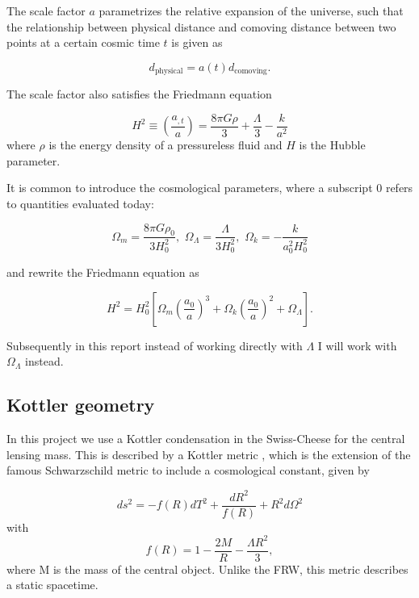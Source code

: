 The scale factor $a$ parametrizes the relative expansion of the universe, such that the relationship between physical distance and comoving distance between two points at a certain cosmic time $t$ is given as

\begin{equation}
  d_{\text{physical}} = a(t) d_{\text{comoving}}.
  \label{eq:comoving-physical-distance}
\end{equation}

The scale factor also satisfies the Friedmann equation

\begin{equation}
  H^2 \equiv \left ( \frac{a_{,t}}{a} \right ) = \frac{8\pi G \rho}{3} + \frac{\Lambda}{3} - \frac{k}{a^2}
  \label{eq:friedmann-equation}
\end{equation}
where $\rho$ is the energy density of a pressureless fluid and $H$ is the Hubble parameter. 

It is common to introduce the cosmological parameters, where a subscript 0 refers to quantities evaluated today: 

\begin{equation}
  \Omega_m = \frac{8\pi G \rho_0}{3H_0^2}, \,\, \Omega_{\Lambda} = \frac{\Lambda}{3H_0^2}, \,\, \Omega_k = - \frac{k}{a_0^2 H_0^2}
  \label{eq:cosmo-params}
\end{equation}

and rewrite the Friedmann equation as

\begin{equation}
  H^2 = H_0^2 \left [ \Omega_m \left ( \frac{a_0}{a}\right )^3 + \Omega_k \left ( \frac{a_0}{a}\right )^2 + \Omega_{\Lambda} \right ]. 
  \label{eq:friedmann-eqn-version2}
\end{equation}

Subsequently in this report instead of working directly with $\Lambda$ I will work with $\Omega_{\Lambda}$ instead. 

\subsection{Kottler geometry}

In this project we use a Kottler condensation in the Swiss-Cheese for the central lensing mass. This is described by a Kottler metric \citep{kottler1918physikalischen}, which is the extension of the famous Schwarzschild metric to include a cosmological constant, given by

\begin{equation}
  ds^2 = -f(R)dT^2 + \frac{dR^2}{f(R)} + R^2 d \Omega^2
  \label{eq:kottler-metric}
\end{equation}
with
\begin{equation}
  f(R) = 1-\frac{2M}{R} - \frac{\Lambda R^2}{3},
  \label{eq:kottler-metric-f}
\end{equation}
where M is the mass of the central object. Unlike the FRW, this metric describes a static spacetime. 

